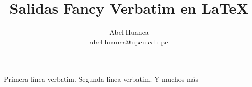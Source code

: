 \documentclass{article}
\begin{document}
\title{Salidas Fancy Verbatim en \LaTeX}
\author{Abel Huanca \\ abel.huanca@upeu.edu.pe}
\maketitle


Primera línea verbatim. 
Segunda línea verbatim. 
Y muchos más


\end{document}
